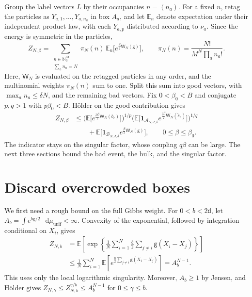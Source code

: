 \documentclass[11pt,reqno]{amsart}
\numberwithin{equation}{section}
\theoremstyle{plain}
\theoremstyle{definition}
\renewcommand{\d}{\mathsf d}
\newcommand{\dd}{\mathop{}\!\mathrm d}
\newcommand{\N}{\mathbb N}
\newcommand{\E}{\mathbb E}
\newcommand{\one}{\mathbf 1}
\newcommand{\be}{\beta}
\newcommand{\g}{\mathsf g}
\newcommand{\muunif}{\mu_{\mathrm{unif}}}
\begin{document}
Group the label vectors $L$ by their occupancies $n=(n_a)$.  For a fixed $n$, retag the particles as $Y_{a,1},\ldots,Y_{a,n_a}$ in box $A_a$, and let $\E_n$ denote expectation under their independent product law, with each $Y_{a,p}$ distributed according to $\nu_a$.  Since the energy is symmetric in the particles,
\begin{equation}
 Z_{N,\be}
 =\sum_{\substack{n\in\N_0^M\\\sum_a n_a=N}}
   \pi_N(n)\,\E_n\big[e^{\frac\be2\mathsf W_N(\g)}\big],
 \qquad
 \pi_N(n)=\frac{N!}{M^N\prod_a n_a!}.
 \label{eq:partition-occupancy-sum}
\end{equation}
Here, $\mathsf W_N$ is evaluated on the retagged particles in any order, and the multinomial weights $\pi_N(n)$ sum to one.  Split this sum into good vectors, with $\max_a n_a\le\delta N$, and the remaining bad vectors.  Fix $0<\be_0<B$ and conjugate $p,q>1$ with $p\be_0<B$.  H\"older on the good contribution gives
\begin{equation}
 \begin{aligned}
 Z_{N,\be}
 &\le
 \Big(\E\big[e^{\frac{p\be}{2}\mathsf W_N(b_r)}\big]\Big)^{1/p}
 \Big(\E\big[\one_{\mathcal A_{N,J,\delta}}
        e^{\frac{q\be}{2}\mathsf W_N(\widetilde s_r)}\big]\Big)^{1/q}\\
 &\qquad+\E\big[\one_{\mathcal B_{N,J,\delta}}
                     e^{\frac\be2\mathsf W_N(\g)}\big],
 \qquad 0\le\be\le\be_0.
 \end{aligned}
 \label{eq:physical-cutoff-holder}
\end{equation}
The indicator stays on the singular factor, whose coupling $q\be$ can be large.  The next three sections bound the bad event, the bulk, and the singular factor.

\section{Discard overcrowded boxes}
\label{subsec:proof-bad-set}
We first need a rough bound on the full Gibbs weight.  For $0<b<2\d$, let
$A_b=\int e^{b\g/2}\,\dd\muunif<\infty$.
Convexity of the exponential, followed by integration conditional on $X_i$, gives
\begin{equation}
 \begin{aligned}
 Z_{N,b}
 &=\E\left[\exp\left\{\frac1N\sum_{i=1}^N
                   \frac b2\sum_{j\ne i}\g(X_i-X_j)\right\}\right]\\
 &\le\frac1N\sum_{i=1}^N
       \E\left[e^{\frac b2\sum_{j\ne i}\g(X_i-X_j)}\right]
 =A_b^{N-1}.
 \end{aligned}
 \label{eq:rough-partition-bound}
\end{equation}
This uses only the local logarithmic singularity.  Moreover, $A_b\ge1$ by Jensen, and H\"older gives $Z_{N,\gamma}\le Z_{N,b}^{\gamma/b}\le A_b^{N-1}$ for $0\le\gamma\le b$.
\end{document}
